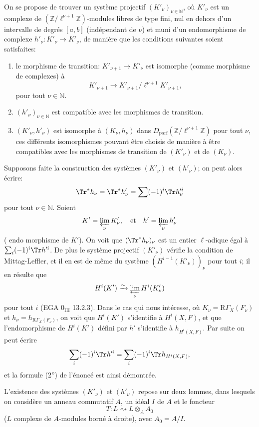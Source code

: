 On se propose de trouver un système projectif $(K'_\nu)_{\nu\in\mathbb{N}}$, où $K'_\nu$ est un complexe de $(\mathbb{Z}/\ell^{\nu+1}\mathbb{Z})$-modules libres de type fini, nul en dehors d'un intervalle de degrés $[a,b]$ (indépendant de $\nu$) et muni d'un endomorphisme de complexe $h'_\nu:K'_\nu\to K'_\nu$, de manière que les conditions suivantes soient satisfaites:
\begin{enumerate}[label=\arabic*)]
\item le morphisme de transition: $K'_{\nu+1}\to K'_\nu$ est isomorphe (comme morphisme de complexes) à
\[
K'_{\nu+1}\to K'_{\nu+1}/\ell^{\nu+1}K'_{\nu+1},
\]
pour tout $\nu\in\mathbb{N}$.
\item $(h'_\nu)_{\nu\in\mathbb{N}}$ est compatible avec les morphismes de transition.
\item $(K'_\nu,h'_\nu)$ est isomorphe à $(K_\nu,h_\nu)$ dans $D_{\mathrm{parf}}(\mathbb{Z}/\ell^{\nu+1}\mathbb{Z})$ pour tout $\nu$, ces différents isomorphismes pouvant être choisis de manière à être compatibles avec les morphismes de transition de $(K'_\nu)$ et de $(K_\nu)$.
\end{enumerate}
Supposons faite la construction des systèmes $(K'_\nu)$ et $(h'_\nu)$; on peut alors écrire:
\[
\Tr^*h_\nu=\Tr^*h'_\nu=\sum(-1)^i\Tr h_\nu'^i
\]
pour tout $\nu\in\mathbb{N}$. Soient
\[
K'=\varprojlim_\nu K'_\nu,
\quad\text{et}\quad h'=\varprojlim_\nu h'_\nu
\]
(
endo%
morphisme de $K'$). On voit que $(\Tr^*h_\nu)_\nu$ est un entier $\ell$-adique égal à $\sum_i(-1)^i\Tr h'^i$. De plus le système projectif $(K'_\nu)$ vérifie la condition de Mittag-Leffler, et il en est de même du système $(H^{i-1}(K'_\nu))_\nu$ pour tout $i$; il en résulte que
\[
H^i(K')\xrightarrow{\sim}\varprojlim_\nu H^i(K'_\nu)
\]
pour tout $i$ (EGA $0_{\mathrm{III}}$ 13.2.3). Dans le cas qui nous intéresse, où $K_\nu=\mathrm{R}\Gamma_X(F_\nu)$ et $h_\nu=h_{\mathrm{R}\Gamma_X(F_\nu)}$, on voit que $H^i(K')$ s'identifie à $H^i(X,F)$, et que l'endomorphisme de $H^i(K')$ défini par $h'$ s'identifie à $h_{H^i(X,F)}$. Par suite on peut écrire
\[
\sum_i(-1)^i\Tr h'^i=
\sum_i(-1)^i\Tr h_{H^i(X,F)},
\]
et la formule (2'') de l'énoncé est ainsi démontrée.

L'existence des systèmes $(K'_\nu)$ et $(h'_\nu)$ repose sur deux lemmes, dans lesquels on considère un anneau commutatif $A$, un idéal $I$ de $A$ et le foncteur
\[
T:L\rightsquigarrow L\otimes_A A_0
\]
($L$ complexe de $A$-modules borné à droite), avec $A_0=A/I$.


